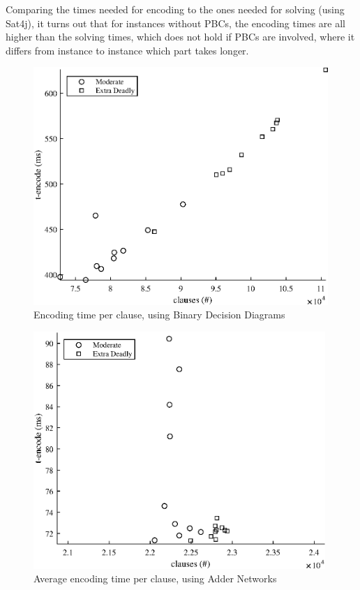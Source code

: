 Comparing the times needed for encoding to the ones needed for solving (using Sat4j), it turns out that for instances without PBCs, the encoding times are all higher than the solving times, which does not hold if PBCs are involved, where it differs from instance to instance which part takes longer.






\clearpage
\FloatBarrier
{
\renewcommand{\figurename}{Plot}

\begin{figure}
    \centering
    \vspace{8.7mm}
    \includegraphics[height = 90mm]{Figures/killer_BDD_encode.eps}
    \caption{Encoding time per clause, using Binary Decision Diagrams}
    \label{killerBDDencode}
\end{figure}

\begin{figure}
    \centering
    \vspace{11mm}
    \includegraphics[height = 90mm]{Figures/killer_AN_encode.eps}
    \caption{Average encoding time per clause, using Adder Networks}
    \label{killerANencode}
\end{figure}

}

